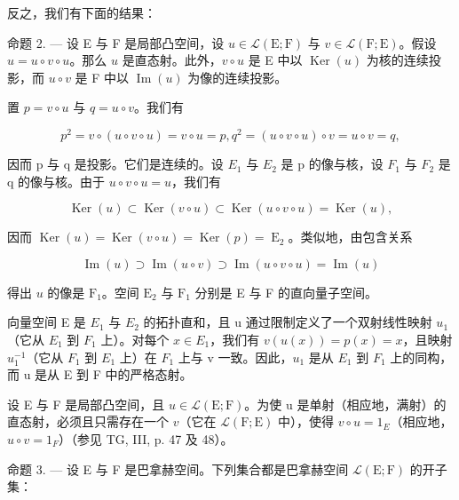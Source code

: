 反之，我们有下面的结果：

命题 2. --- 设 E 与 F 是局部凸空间，设 \(u \in \mathcal{L}(\mathrm{E};\mathrm{F})\) 与 \(v \in \mathcal{L}(\mathrm{F};\mathrm{E})\)。假设 \(u = u \circ v \circ u\)。那么 \(u\) 是直态射。此外，\(v \circ u\) 是 E 中以 \(\operatorname{Ker}(u)\) 为核的连续投影，而 \(u \circ v\) 是 F 中以 \(\operatorname{Im}(u)\) 为像的连续投影。

置 \(p = v \circ u\) 与 \(q = u \circ v\)。我们有

\[
p ^ {2} = v \circ (u \circ v \circ u) = v \circ u = p, q ^ {2} = (u \circ v \circ u) \circ v = u \circ v = q,
\]

因而 p 与 q 是投影。它们是连续的。设 \(E_{1}\) 与 \(E_{2}\) 是 p 的像与核，设 \(F_{1}\) 与 \(F_{2}\) 是 q 的像与核。由于 \(u \circ v \circ u = u\)，我们有

\[
\operatorname{Ker} (u) \subset \operatorname{Ker} (v \circ u) \subset \operatorname{Ker} (u \circ v \circ u) = \operatorname{Ker} (u),
\]

因而 \(\operatorname{Ker}(u) = \operatorname{Ker}(v \circ u) = \operatorname{Ker}(p) = \operatorname{E}_{2}\)。类似地，由包含关系

\[
\operatorname{Im} (u) \supset \operatorname{Im} (u \circ v) \supset \operatorname{Im} (u \circ v \circ u) = \operatorname{Im} (u)
\]

得出 \(u\) 的像是 \(\mathrm{F}_{1}\)。空间 \(\mathrm{E}_{2}\) 与 \(\mathrm{F}_{1}\) 分别是 E 与 F 的直向量子空间。

向量空间 E 是 \(E_{1}\) 与 \(E_{2}\) 的拓扑直和，且 u 通过限制定义了一个双射线性映射 \(u_{1}\)（它从 \(E_{1}\) 到 \(F_{1}\) 上）。对每个 \(x \in E_{1}\)，我们有 \(v(u(x)) = p(x) = x\)，且映射 \(u_{1}^{-1}\)（它从 \(F_{1}\) 到 \(E_{1}\) 上）在 \(F_{1}\) 上与 v 一致。因此，\(u_{1}\) 是从 \(E_{1}\) 到 \(F_{1}\) 上的同构，而 u 是从 E 到 F 中的严格态射。

设 E 与 F 是局部凸空间，且 \(u \in \mathcal{L}(\mathrm{E};\mathrm{F})\)。为使 u 是单射（相应地，满射）的直态射，必须且只需存在一个 \(v\)（它在 \(\mathcal{L}(\mathrm{F};\mathrm{E})\) 中），使得 \(v \circ u = 1_{E}\)（相应地，\(u \circ v = 1_{F}\)）（参见 TG, III, p. 47 及 48）。

命题 3. --- 设 E 与 F 是巴拿赫空间。下列集合都是巴拿赫空间 \(\mathcal{L}(\mathrm{E};\mathrm{F})\) 的开子集：

